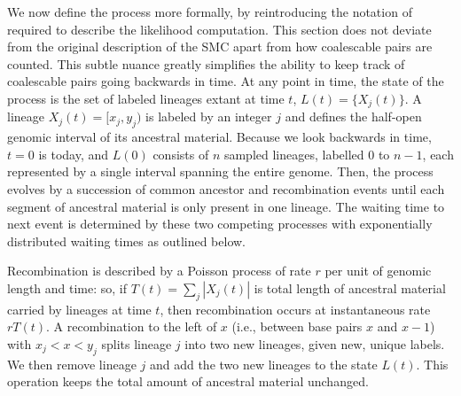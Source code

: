 \documentclass{article}
\begin{document}
We now define the process more formally, by reintroducing
the notation of \citet{mcvean_approximating_2005} required to describe
the likelihood computation. This section
does not deviate from the original description of the SMC apart from
how coalescable pairs are counted. This subtle nuance
greatly simplifies the ability to keep track of coalescable pairs going
backwards in time.
At any point in time, the state of the process is 
the set of labeled lineages extant at time $t$,
$L(t) = \{X_j(t)\}$.
A lineage $X_j(t) = [x_{j}, y_{j})$ is labeled by 
an integer $j$ and defines the 
half-open genomic interval of its ancestral material.
Because we look backwards in time, $t=0$ is today, and 
$L(0)$ consists of $n$ sampled lineages, labelled $0$ to $n-1$,
each represented by a single interval spanning the entire genome.
Then, the process evolves by a succession of common ancestor and recombination
events until each segment of ancestral material is only present in one lineage.
The waiting time to next event is determined by these two competing processes
with exponentially distributed waiting times as outlined below.

Recombination is described by a Poisson process of rate $r$ per unit 
of genomic length and time:
so, if $T(t) = \sum_j |X_j(t)|$ is total length of ancestral material
carried by lineages at time $t$,
then recombination occurs at instantaneous rate $rT(t)$.
A recombination to the left of $x$
(i.e., between base pairs $x$ and $x-1$)
with $x_{j} < x <y_{j}$ splits lineage $j$ into two new lineages,
given new, unique labels. We then remove lineage $j$
and add the two new lineages to the state $L(t)$.
This operation keeps the total amount of ancestral material unchanged.
\end{document}
